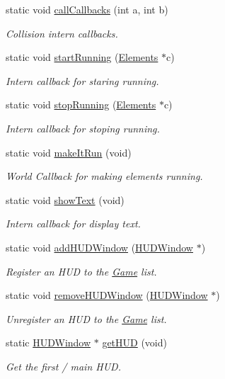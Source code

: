 \begin{DoxyCompactItemize}
\item 
static void \hyperlink{class_game_a34c8791251f785d270f757b6eff4ea56}{call\-Callbacks} (int a, int b)
\begin{DoxyCompactList}\small\item\em Collision intern callbacks. \end{DoxyCompactList}\item 
static void \hyperlink{class_game_a27ad8f2a6f8f098cc28377df13c4ec2e}{start\-Running} (\hyperlink{class_elements}{Elements} $\ast$c)
\begin{DoxyCompactList}\small\item\em Intern callback for staring running. \end{DoxyCompactList}\item 
static void \hyperlink{class_game_a9394f6f0c90bde35fb0bd4ca3316c3f0}{stop\-Running} (\hyperlink{class_elements}{Elements} $\ast$c)
\begin{DoxyCompactList}\small\item\em Intern callback for stoping running. \end{DoxyCompactList}\item 
static void \hyperlink{class_game_ae763ecd953645a586b638a46b908ca5a}{make\-It\-Run} (void)
\begin{DoxyCompactList}\small\item\em World Callback for making elements running. \end{DoxyCompactList}\item 
static void \hyperlink{class_game_a5cf54b4cf9d8bf024f8936fedf11ccea}{show\-Text} (void)
\begin{DoxyCompactList}\small\item\em Intern callback for display text. \end{DoxyCompactList}\item 
static void \hyperlink{class_game_a88d713d54d9303c38c897635c7c04cf4}{add\-H\-U\-D\-Window} (\hyperlink{class_h_u_d_window}{H\-U\-D\-Window} $\ast$)
\begin{DoxyCompactList}\small\item\em Register an H\-U\-D to the \hyperlink{class_game}{Game} list. \end{DoxyCompactList}\item 
static void \hyperlink{class_game_a80e17eab80071411eff5eb38d6b7fc76}{remove\-H\-U\-D\-Window} (\hyperlink{class_h_u_d_window}{H\-U\-D\-Window} $\ast$)
\begin{DoxyCompactList}\small\item\em Unregister an H\-U\-D to the \hyperlink{class_game}{Game} list. \end{DoxyCompactList}\item 
static \hyperlink{class_h_u_d_window}{H\-U\-D\-Window} $\ast$ \hyperlink{class_game_a8339342d69fc241d349da9404ce088c5}{get\-H\-U\-D} (void)
\begin{DoxyCompactList}\small\item\em Get the first / main H\-U\-D. \end{DoxyCompactList}\end{DoxyCompactItemize}

